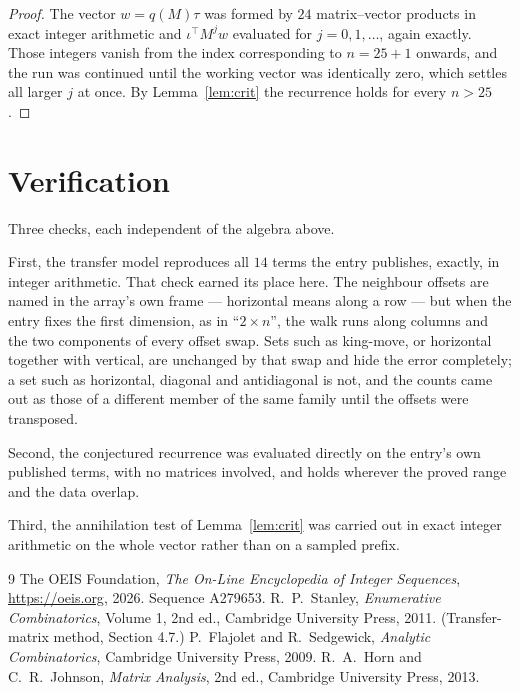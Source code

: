 \documentclass[11pt,a4paper]{article}
\theoremstyle{plain}
\theoremstyle{definition}
\begin{document}
\begin{proof}
The vector $w=q(M)\tau$ was formed by $24$ matrix--vector products in exact integer
arithmetic and $\iota^{\!\top}M^{j}w$ evaluated for $j=0,1,\dots$, again exactly. Those
integers vanish from the index corresponding to $n=25+1$ onwards, and the run was
continued until the working vector was identically zero, which settles all larger $j$ at once.
By Lemma~\ref{lem:crit} the recurrence holds for every $n>25$.
\end{proof}

\section{Verification}

Three checks, each independent of the algebra above.

First, the transfer model reproduces all $14$ terms the entry publishes, exactly, in
integer arithmetic. That check earned its place here. The neighbour offsets are named in the
array's own frame --- horizontal means along a row --- but when the entry fixes the first
dimension, as in ``$2\times n$'', the walk runs along columns and the two components of every
offset swap. Sets such as king-move, or horizontal together with vertical, are unchanged by
that swap and hide the error completely; a set such as horizontal, diagonal and antidiagonal
is not, and the counts came out as those of a different member of the same family until the
offsets were transposed.

Second, the conjectured recurrence was evaluated directly on the entry's own published terms,
with no matrices involved, and holds wherever the proved range and the data overlap.

Third, the annihilation test of Lemma~\ref{lem:crit} was carried out in exact integer
arithmetic on the whole vector rather than on a sampled prefix.

\begin{thebibliography}{9}
 The OEIS Foundation, \emph{The On-Line Encyclopedia of Integer
Sequences}, \url{https://oeis.org}, 2026. Sequence A279653.
 R.~P.~Stanley, \emph{Enumerative Combinatorics}, Volume 1, 2nd ed.,
Cambridge University Press, 2011. (Transfer-matrix method, Section 4.7.)
 P.~Flajolet and R.~Sedgewick, \emph{Analytic Combinatorics}, Cambridge
University Press, 2009.
 R.~A.~Horn and C.~R.~Johnson, \emph{Matrix Analysis}, 2nd ed., Cambridge
University Press, 2013.
\end{thebibliography}
\end{document}
